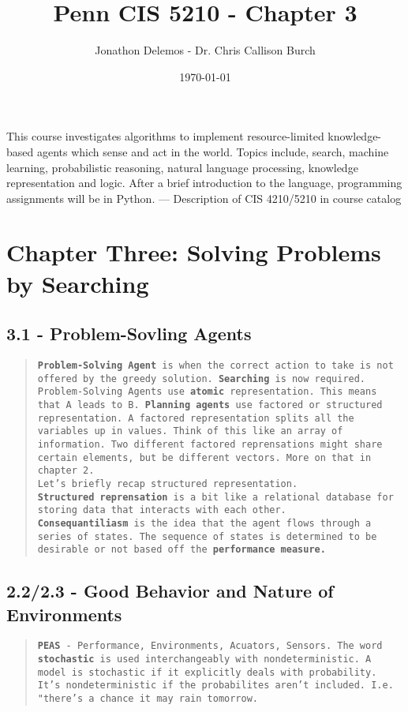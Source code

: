 \documentclass{article}
\title{Penn CIS 5210 - Chapter 3}
\author{Jonathon Delemos - Dr. Chris Callison Burch}
\date{\today}
\begin{document}
\maketitle

This course investigates algorithms to implement resource-limited knowledge-based agents which
sense and act in the world. Topics include, search, machine learning, probabilistic reasoning, natural
language processing, knowledge representation and logic. After a brief introduction to the language,
programming assignments will be in Python.
— Description of CIS 4210/5210 in course catalog

\section{Chapter Three: Solving Problems by Searching}
\subsection{3.1 - Problem-Sovling Agents}
\begin{quote}
    \texttt{\textbf{Problem-Solving Agent} is when the correct action to take is not offered by the greedy solution. \textbf{Searching} is now required.
        \\ Problem-Solving Agents use \textbf{atomic} representation. This means that A leads to B. \textbf{Planning agents} use factored or structured representation. A factored representation splits
        all the variables up in values. Think of this like an array of information. Two different factored reprensations might share certain elements, but be different vectors. More on that in chapter 2.
        \\ Let's briefly recap structured representation.\\ \textbf{Structured reprensation} is a bit like a relational database for storing data that interacts with each other.
        \\ \textbf{Consequantiliasm} is the idea that the agent flows through a series of states. The sequence of states is determined to be desirable or not based off the \textbf{performance measure.}
        \\}
\end{quote}
\subsection{2.2/2.3 - Good Behavior and Nature of Environments}
\begin{quote}
    \texttt{\textbf{PEAS} - Performance, Environments, Acuators, Sensors. The word \textbf{stochastic} is used interchangeably with nondeterministic. A model is stochastic
        if it explicitly deals with probability. It's nondeterministic if the probabilites aren't included. I.e. "there's a chance it may rain tomorrow.}
\end{quote}
\end{document}
